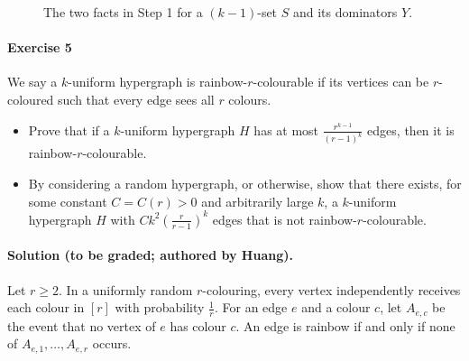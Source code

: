 \documentclass[a4paper,12pt]{article}
\begin{document}
\begin{figure}[ht]
\centering
{}
\caption{The two facts in Step 1 for a $(k-1)$-set $S$ and its dominators $Y$.}
\label{fig:ex4}
\end{figure}

\paragraph{Exercise 5}  We say a $k$-uniform hypergraph is rainbow-$r$-colourable if its vertices can be $r$-coloured such that every edge sees all $r$ colours.
\begin{itemize}
	\item[(a)] Prove that if a $k$-uniform hypergraph $H$ has at most $\frac{r^{k-1}}{(r-1)^k}$ edges, then it is rainbow-$r$-colourable.
	\item[(b)] By considering a random hypergraph, or otherwise, show that there exists, for some constant $C = C(r) > 0$ and arbitrarily large $k$, a $k$-uniform hypergraph $H$ with $C k^2 \left( \frac{r}{r-1} \right)^k$ edges that is not rainbow-$r$-colourable.
\end{itemize}

\paragraph{Solution (to be graded; authored by Huang).} Let $r \ge 2$. In a uniformly random $r$-colouring, every vertex independently receives each colour in $[r]$ with probability $\frac1r$. For an edge $e$ and a colour $c$, let $A_{e,c}$ be the event that no vertex of $e$ has colour $c$. An edge is rainbow if and only if none of $A_{e,1}, \dots, A_{e,r}$ occurs.
\end{document}
